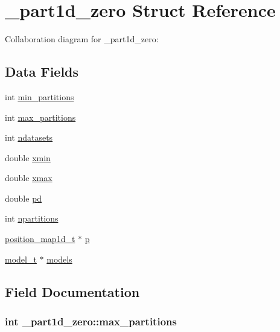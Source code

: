 \hypertarget{struct__part1d__zero}{}\section{\+\_\+part1d\+\_\+zero Struct Reference}
\label{struct__part1d__zero}


Collaboration diagram for \+\_\+part1d\+\_\+zero\+:
\subsection*{Data Fields}
\begin{DoxyCompactItemize}
\item 
int \hyperlink{struct__part1d__zero_a574be34a06cb790979fae4ab31cb6160}{min\+\_\+partitions}
\item 
int \hyperlink{struct__part1d__zero_a3b973a0ad4bf0e1f0dbac992e095644e}{max\+\_\+partitions}
\item 
int \hyperlink{struct__part1d__zero_a96fbc5c54cb93b575d0b11d974cb4b5b}{ndatasets}
\item 
double \hyperlink{struct__part1d__zero_abac11d96c024ecf225c080396b508ebc}{xmin}
\item 
double \hyperlink{struct__part1d__zero_a581d99a73929857440416ba5efb37957}{xmax}
\item 
double \hyperlink{struct__part1d__zero_a821c8c29d570d780856fe35e2f2deadd}{pd}
\item 
int \hyperlink{struct__part1d__zero_acce7923182d5ca81f5956ccde9807d14}{npartitions}
\item 
\hyperlink{position__map1d_8h_aced1bad6e33e2b5679d6d06747735cf6}{position\+\_\+map1d\+\_\+t} $\ast$ \hyperlink{struct__part1d__zero_a77f81843128e319523a47a0d1a476515}{p}
\item 
\hyperlink{part1d__forwardmodel_8c_a0a038e31b1f765296a40c2da07b46a84}{model\+\_\+t} $\ast$ \hyperlink{struct__part1d__zero_a31120b620786ea66e282a6b41c23e672}{models}
\end{DoxyCompactItemize}


\subsection{Field Documentation}
\subsubsection[{\texorpdfstring{max\+\_\+partitions}{max_partitions}}]{\setlength{\rightskip}{0pt plus 5cm}int \+\_\+part1d\+\_\+zero\+::max\+\_\+partitions}\hypertarget{struct__part1d__zero_a3b973a0ad4bf0e1f0dbac992e095644e}{}\label{struct__part1d__zero_a3b973a0ad4bf0e1f0dbac992e095644e}


